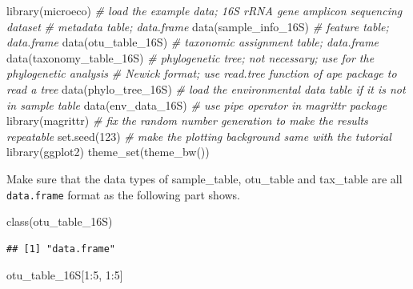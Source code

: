 \documentclass[
]{book}
\newenvironment{Shaded}{\begin{snugshade}}{\end{snugshade}}
\newcommand{\CommentTok}[1]{\textcolor[rgb]{0.56,0.35,0.01}{\textit{#1}}}
\newcommand{\DecValTok}[1]{\textcolor[rgb]{0.00,0.00,0.81}{#1}}
\newcommand{\FunctionTok}[1]{\textcolor[rgb]{0.00,0.00,0.00}{#1}}
\newcommand{\NormalTok}[1]{#1}
\newcommand{\SpecialCharTok}[1]{\textcolor[rgb]{0.00,0.00,0.00}{#1}}
\begin{document}
\begin{Shaded}
\begin{Highlighting}[]
\FunctionTok{library}\NormalTok{(microeco)}
\CommentTok{\# load the example data; 16S rRNA gene amplicon sequencing dataset}
\CommentTok{\# metadata table; data.frame}
\FunctionTok{data}\NormalTok{(sample\_info\_16S)}
\CommentTok{\# feature table; data.frame}
\FunctionTok{data}\NormalTok{(otu\_table\_16S)}
\CommentTok{\# taxonomic assignment table; data.frame}
\FunctionTok{data}\NormalTok{(taxonomy\_table\_16S)}
\CommentTok{\# phylogenetic tree; not necessary; use for the phylogenetic analysis}
\CommentTok{\# Newick format; use read.tree function of ape package to read a tree}
\FunctionTok{data}\NormalTok{(phylo\_tree\_16S)}
\CommentTok{\# load the environmental data table if it is not in sample table}
\FunctionTok{data}\NormalTok{(env\_data\_16S)}
\CommentTok{\# use pipe operator in magrittr package}
\FunctionTok{library}\NormalTok{(magrittr)}
\CommentTok{\# fix the random number generation to make the results repeatable}
\FunctionTok{set.seed}\NormalTok{(}\DecValTok{123}\NormalTok{)}
\CommentTok{\# make the plotting background same with the tutorial}
\FunctionTok{library}\NormalTok{(ggplot2)}
\FunctionTok{theme\_set}\NormalTok{(}\FunctionTok{theme\_bw}\NormalTok{())}
\end{Highlighting}
\end{Shaded}

Make sure that the data types of sample\_table, otu\_table and tax\_table are all \texttt{data.frame} format as the following part shows.

\begin{Shaded}
\begin{Highlighting}[]
\FunctionTok{class}\NormalTok{(otu\_table\_16S)}
\end{Highlighting}
\end{Shaded}

\begin{verbatim}
## [1] "data.frame"
\end{verbatim}

\begin{Shaded}
\begin{Highlighting}[]
\NormalTok{otu\_table\_16S[}\DecValTok{1}\SpecialCharTok{:}\DecValTok{5}\NormalTok{, }\DecValTok{1}\SpecialCharTok{:}\DecValTok{5}\NormalTok{]}
\end{Highlighting}
\end{Shaded}
\end{document}
